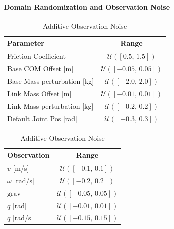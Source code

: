 \paragraph{Domain Randomization and Observation Noise}
\begin{table}[H]
\centering

\begin{minipage}[t]{0.48\textwidth}
\centering
\caption{Domain Randomization}
\vspace{0pt}
\begin{tabular}{l c}
\toprule
\textbf{Parameter} & \textbf{Range} \\
\midrule
Friction Coefficient 
    & $\mathcal{U}([0.5,\,1.5])$ \\
Base COM Offset [m] 
    & $\mathcal{U}([-0.05,\,0.05])$ \\
Base Mass perturbation [kg]
    & $\mathcal{U}([-2.0,\,2.0])$ \\
Link Mass Offset [m] 
    & $\mathcal{U}([-0.01,\,0.01])$ \\
Link Mass perturbation [kg]
    & $\mathcal{U}([-0.2,\,0.2])$ \\
Default Joint Pos [rad] 
    & $\mathcal{U}([-0.3,\,0.3])$ \\
\bottomrule
\end{tabular}
\end{minipage}
\hfill
\begin{minipage}[t]{0.48\textwidth}
\centering
\caption{Additive Observation Noise}
\vspace{0pt}
\begin{tabular}{l c}
\toprule
\textbf{Observation} & \textbf{Range} \\
\midrule
$v$ [m/s] 
    & $\mathcal{U}([-0.1,\,0.1])$ \\
$\omega$ [rad/s] 
    & $\mathcal{U}([-0.2,\,0.2])$ \\
$\mathrm{grav}$ 
    & $\mathcal{U}([-0.05,\,0.05])$ \\
$q$ [rad] 
    & $\mathcal{U}([-0.01,\,0.01])$ \\
$\dot{q}$ [rad/s] 
    & $\mathcal{U}([-0.15,\,0.15])$ \\
\bottomrule
\end{tabular}
\end{minipage}

\end{table}



